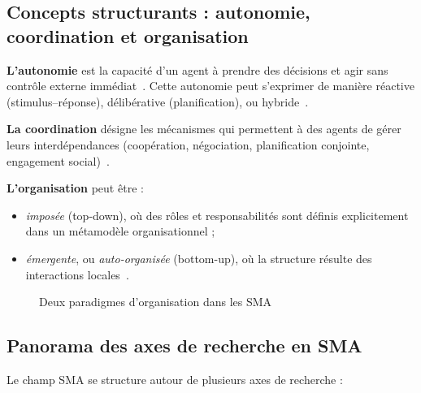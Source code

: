\documentclass[ twoside,openright,titlepage,numbers=noenddot,headinclude,%
                footinclude=true,cleardoublepage=empty,abstractoff, %
                BCOR=5mm,paper=a4,fontsize=11pt,%
                french,american,%
                ]{scrreprt}
\begin{document}
\subsection*{Concepts structurants : autonomie, coordination et organisation}

\textbf{L'autonomie} est la capacité d'un agent à prendre des décisions et agir sans contrôle externe immédiat~\cite{Russell2010}. Cette autonomie peut s'exprimer de manière réactive (stimulus–réponse), délibérative (planification), ou hybride~\cite{Georgeff1999}.

\textbf{La coordination} désigne les mécanismes qui permettent à des agents de gérer leurs interdépendances (coopération, négociation, planification conjointe, engagement social)~\cite{Durfee1999,Jennings1996,Sandholm1999}.

\textbf{L'organisation} peut être :
\begin{itemize}
    \item \emph{imposée} (top-down), où des rôles et responsabilités sont définis explicitement dans un métamodèle organisationnel ;
    \item \emph{émergente}, ou \emph{auto-organisée} (bottom-up), où la structure résulte des interactions locales~\cite{Heylighen2001,DiMarzoSerugendo2005}.
\end{itemize}

\begin{figure}[h]
    \centering
    \caption{Deux paradigmes d'organisation dans les SMA}
    \label{fig:auto_vs_topdown}
\end{figure}

\subsection*{Panorama des axes de recherche en SMA}

Le champ SMA se structure autour de plusieurs axes de recherche :
\end{document}
